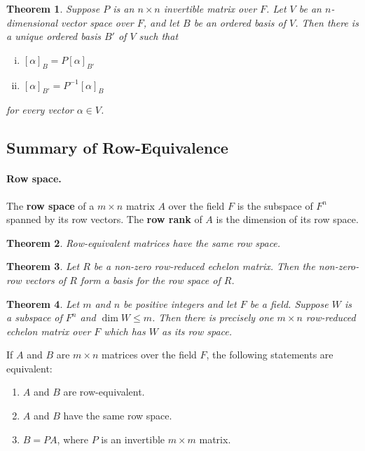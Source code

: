 \documentclass{article}
\newtheorem{theorem}{Theorem}[section]
\begin{document}
\begin{theorem}
  Suppose $P$ is an $n \times n$ invertible matrix over $F$. Let $V$ be an
  $n$-dimensional vector space over $F$, and let $B$ be an ordered basis of $V$.
  Then there is a unique ordered basis $B'$ of $V$ such that
  \begin{enumerate}[(i)]
    \item $[\alpha]_B = P[\alpha]_{B'}$
    \item $[\alpha]_{B'} = P^{-1}[\alpha]_B$
  \end{enumerate}
  for every vector $\alpha \in V$.
\end{theorem}

\subsection{Summary of Row-Equivalence}

\paragraph{Row space.} The \textbf{row space} of a $m \times n$ matrix $A$ over
the field $F$ is the subspace of $F^n$ spanned by its row vectors. The
\textbf{row rank} of $A$ is the dimension of its row space.

\begin{theorem}
  Row-equivalent matrices have the same row space.
\end{theorem}

\begin{theorem}
  Let $R$ be a non-zero row-reduced echelon matrix. Then the non-zero-row
  vectors of $R$ form a basis for the row space of $R$.
\end{theorem}

\begin{theorem}
  Let $m$ and $n$ be positive integers and let $F$ be a field. Suppose $W$ is a
  subspace of $F^n$ and $\dim W \leq m$. Then there is precisely one $m \times
  n$ row-reduced echelon matrix over $F$ which has $W$ as its row space.
\end{theorem}

If $A$ and $B$ are $m \times n$ matrices over the field $F$, the following
statements are equivalent:
\begin{enumerate}
  \item $A$ and $B$ are row-equivalent.
  \item $A$ and $B$ have the same row space.
  \item $B = PA$, where $P$ is an invertible $m \times m$ matrix.
\end{enumerate}
\end{document}
